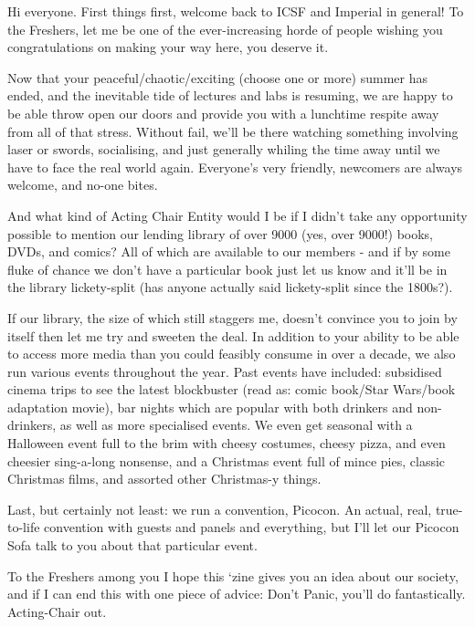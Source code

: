 Hi everyone. 
First things first, welcome back to ICSF and Imperial in general! To the Freshers, let me be one of the ever-increasing horde of people wishing you congratulations on making your way here, you deserve it. 

Now that your peaceful/chaotic/exciting (choose one or more) summer has ended, and the inevitable tide of lectures and labs is resuming, we are happy to be able throw open our doors and provide you with a lunchtime respite away from all of that stress. 
Without fail, we’ll be there watching something involving laser or swords, socialising, and just generally whiling the time away until we have to face the real world again. Everyone’s very friendly, newcomers are always welcome, and no-one bites. 

And what kind of Acting Chair Entity would I be if I didn’t take any opportunity possible to mention our lending library of over 9000 (yes, over 9000!) books, DVDs, and comics? All of which are available to our members - and if by some fluke of chance we don’t have a particular book just let us know and it’ll be in the library lickety-split (has anyone actually said lickety-split since the 1800s?). 

If our library, the size of which still staggers me, doesn’t convince you to join by itself then let me try and sweeten the deal.
In addition to your ability to be able to access more media than you could feasibly consume in over a decade, we also run various events throughout the year. Past events have included: subsidised cinema trips to see the latest blockbuster (read as: comic book/Star Wars/book adaptation movie), bar nights which are popular with both drinkers and non-drinkers, as well as more specialised events. 
We even get seasonal with a Halloween event full to the brim with cheesy costumes, cheesy pizza, and even cheesier sing-a-long nonsense, and a Christmas event full of mince pies, classic Christmas films, and assorted other Christmas-y things. 

Last, but certainly not least: we run a convention, Picocon. An actual, real, true-to-life convention with guests and panels and everything, but I’ll let our Picocon Sofa talk to you about that particular event. 

To the Freshers among you I hope this ‘zine gives you an idea about our society, and if I can end this with one piece of advice: Don’t Panic, you’ll do fantastically. Acting-Chair out.
